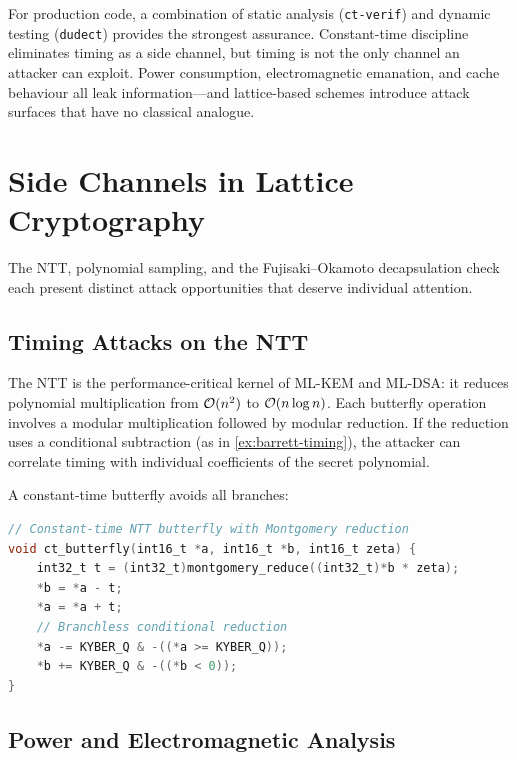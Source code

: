 For production code, a combination of static analysis (\texttt{ct-verif}) and dynamic testing (\texttt{dudect}) provides the strongest assurance.  Constant-time discipline eliminates timing as a side channel, but timing is not the only channel an attacker can exploit.  Power consumption, electromagnetic emanation, and cache behaviour all leak information---and lattice-based schemes introduce attack surfaces that have no classical analogue.


\section{Side Channels in Lattice Cryptography}
\label{sec:side-channels}

The NTT, polynomial sampling, and the Fujisaki--Okamoto decapsulation check each present distinct attack opportunities that deserve individual attention.

\subsection{Timing Attacks on the NTT}
\label{subsec:ntt-timing}

The NTT is the performance-critical kernel of ML-KEM and ML-DSA: it reduces polynomial multiplication from $\mathcal{O}(n^2)$ to $\mathcal{O}(n \log n)$.  Each butterfly operation involves a modular multiplication followed by modular reduction.  If the reduction uses a conditional subtraction (as in \cref{ex:barrett-timing}), the attacker can correlate timing with individual coefficients of the secret polynomial.

A constant-time butterfly avoids all branches:

\begin{lstlisting}[language=C]
// Constant-time NTT butterfly with Montgomery reduction
void ct_butterfly(int16_t *a, int16_t *b, int16_t zeta) {
    int32_t t = (int32_t)montgomery_reduce((int32_t)*b * zeta);
    *b = *a - t;
    *a = *a + t;
    // Branchless conditional reduction
    *a -= KYBER_Q & -((*a >= KYBER_Q));
    *b += KYBER_Q & -((*b < 0));
}
\end{lstlisting}

\subsection{Power and Electromagnetic Analysis}
\label{subsec:power-em}

